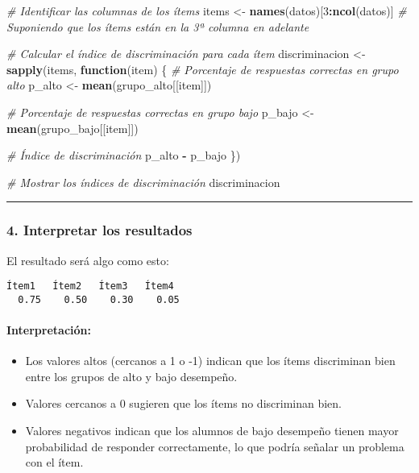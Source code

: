 \documentclass[
]{article}
\newenvironment{Shaded}{\begin{snugshade}}{\end{snugshade}}
\newcommand{\CommentTok}[1]{\textcolor[rgb]{0.56,0.35,0.01}{\textit{#1}}}
\newcommand{\ControlFlowTok}[1]{\textcolor[rgb]{0.13,0.29,0.53}{\textbf{#1}}}
\newcommand{\DecValTok}[1]{\textcolor[rgb]{0.00,0.00,0.81}{#1}}
\newcommand{\FunctionTok}[1]{\textcolor[rgb]{0.13,0.29,0.53}{\textbf{#1}}}
\newcommand{\NormalTok}[1]{#1}
\newcommand{\OtherTok}[1]{\textcolor[rgb]{0.56,0.35,0.01}{#1}}
\newcommand{\SpecialCharTok}[1]{\textcolor[rgb]{0.81,0.36,0.00}{\textbf{#1}}}
\providecommand{\tightlist}{%
  \setlength{\itemsep}{0pt}\setlength{\parskip}{0pt}}
\begin{document}
\begin{Shaded}
\begin{Highlighting}[]
\CommentTok{\# Identificar las columnas de los ítems}
\NormalTok{items }\OtherTok{\textless{}{-}} \FunctionTok{names}\NormalTok{(datos)[}\DecValTok{3}\SpecialCharTok{:}\FunctionTok{ncol}\NormalTok{(datos)] }\CommentTok{\# Suponiendo que los ítems están en la 3ª columna en adelante}

\CommentTok{\# Calcular el índice de discriminación para cada ítem}
\NormalTok{discriminacion }\OtherTok{\textless{}{-}} \FunctionTok{sapply}\NormalTok{(items, }\ControlFlowTok{function}\NormalTok{(item) \{}
  \CommentTok{\# Porcentaje de respuestas correctas en grupo alto}
\NormalTok{  p\_alto }\OtherTok{\textless{}{-}} \FunctionTok{mean}\NormalTok{(grupo\_alto[[item]])}
  
  \CommentTok{\# Porcentaje de respuestas correctas en grupo bajo}
\NormalTok{  p\_bajo }\OtherTok{\textless{}{-}} \FunctionTok{mean}\NormalTok{(grupo\_bajo[[item]])}
  
  \CommentTok{\# Índice de discriminación}
\NormalTok{  p\_alto }\SpecialCharTok{{-}}\NormalTok{ p\_bajo}
\NormalTok{\})}

\CommentTok{\# Mostrar los índices de discriminación}
\NormalTok{discriminacion}
\end{Highlighting}
\end{Shaded}

\begin{center}\rule{0.5\linewidth}{0.5pt}\end{center}

\subsubsection{\texorpdfstring{\textbf{4. Interpretar los
resultados}}{4. Interpretar los resultados}}\label{interpretar-los-resultados}

El resultado será algo como esto:

\begin{verbatim}
Ítem1   Ítem2   Ítem3   Ítem4 
  0.75    0.50    0.30    0.05 
\end{verbatim}

\paragraph{Interpretación:}\label{interpretaciuxf3n}

\begin{itemize}
\tightlist
\item
  Los valores altos (cercanos a 1 o -1) indican que los ítems
  discriminan bien entre los grupos de alto y bajo desempeño.
\item
  Valores cercanos a 0 sugieren que los ítems no discriminan bien.
\item
  Valores negativos indican que los alumnos de bajo desempeño tienen
  mayor probabilidad de responder correctamente, lo que podría señalar
  un problema con el ítem.
\end{itemize}
\end{document}
